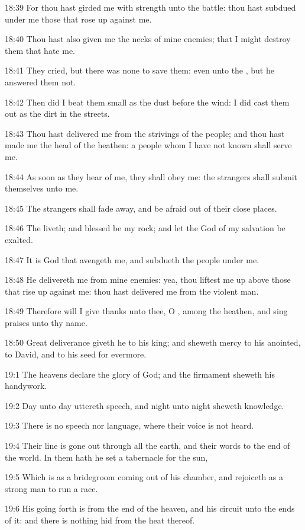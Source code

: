 18:39 For thou hast girded me with strength unto the battle: thou hast subdued under me those that rose up against me.

18:40 Thou hast also given me the necks of mine enemies; that I might destroy them that hate me.

18:41 They cried, but there was none to save them: even unto the \LORD, but he answered them not.

18:42 Then did I beat them small as the dust before the wind: I did cast them out as the dirt in the streets.

18:43 Thou hast delivered me from the strivings of the people; and thou hast made me the head of the heathen: a people whom I have not known shall serve me.

18:44 As soon as they hear of me, they shall obey me: the strangers shall submit themselves unto me.

18:45 The strangers shall fade away, and be afraid out of their close places.

18:46 The \LORD liveth; and blessed be my rock; and let the God of my salvation be exalted.

18:47 It is God that avengeth me, and subdueth the people under me.

18:48 He delivereth me from mine enemies: yea, thou liftest me up above those that rise up against me: thou hast delivered me from the violent man.

18:49 Therefore will I give thanks unto thee, O \LORD, among the heathen, and sing praises unto thy name.

18:50 Great deliverance giveth he to his king; and sheweth mercy to his anointed, to David, and to his seed for evermore.



19:1 The heavens declare the glory of God; and the firmament sheweth his handywork.

19:2 Day unto day uttereth speech, and night unto night sheweth knowledge.

19:3 There is no speech nor language, where their voice is not heard.

19:4 Their line is gone out through all the earth, and their words to the end of the world. In them hath he set a tabernacle for the sun,

19:5 Which is as a bridegroom coming out of his chamber, and rejoiceth as a strong man to run a race.

19:6 His going forth is from the end of the heaven, and his circuit unto the ends of it: and there is nothing hid from the heat thereof.

